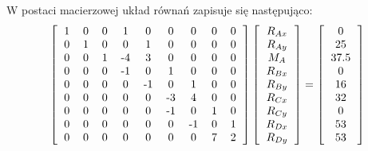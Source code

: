 \documentclass{instrukcja}
\begin{document}
W postaci macierzowej układ równań zapisuje się następująco:
\begin{displaymath}
\left[ \begin{tabular}{c c c c c c c c c} 1 & 0 & 0 & 1 & 0 & 0 & 0 & 0 & 0 \\
 0 & 1 & 0 & 0 & 1 & 0 & 0 & 0 & 0 \\
 0 & 0 & 1 & -4 & 3 & 0 & 0 & 0 & 0 \\
 0 & 0 & 0 & -1 & 0 & 1 & 0 & 0 & 0 \\
 0 & 0 & 0 & 0 & -1 & 0 & 1 & 0 & 0 \\
 0 & 0 & 0 & 0 & 0 & -3 & 4 & 0 & 0 \\
 0 & 0 & 0 & 0 & 0 & -1 & 0 & 1 & 0 \\
 0 & 0 & 0 & 0 & 0 & 0 & -1 & 0 & 1 \\
 0 & 0 & 0 & 0 & 0 & 0 & 0 & 7 & 2 \\
  \end{tabular} \right]
\left[ \begin{tabular}{c} $R_{Ax}$ \\
$R_{Ay}$ \\
$M_A$ \\
$R_{Bx}$ \\
$R_{By}$ \\
$R_{Cx}$ \\
$R_{Cy}$ \\
$R_{Dx}$ \\
$R_{Dy}$ \\
\end{tabular} \right] = \left[
\begin{tabular}{c} 0 \\
25 \\
37.5 \\
0 \\
16 \\
32 \\
0 \\
53 \\
53 \\ \end{tabular} \right]
\end{displaymath}
\end{document}
